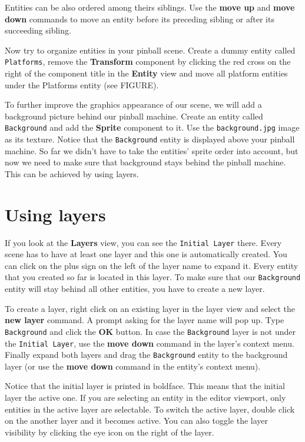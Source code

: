 \documentclass[a4paper,12pt]{article}
\begin{document}
Entities can be also ordered among theirs siblings. Use the \textbf{move up} and \textbf{move down} commands to move an entity before its preceding sibling or after its succeeding sibling.

Now try to organize entities in your pinball scene. Create a dummy entity called \texttt{Platforms}, remove the \textbf{Transform} component by clicking the red cross on the right of the component title in the \textbf{Entity} view and move all platform entities under the Platforms entity (see FIGURE).

To further improve the graphics appearance of our scene, we will add a background picture behind our pinball machine. Create an entity called \texttt{Background} and add the \textbf{Sprite} component to it. Use the \texttt{background.jpg} image as its texture. Notice that the \texttt{Background} entity is displayed above your pinball machine. So far we didn't have to take the entities' sprite order into account, but now we need to make sure that background stays behind the pinball machine. This can be achieved by using layers.  

\section{Using layers}

If you look at the \textbf{Layers} view, you can see the \texttt{Initial Layer} there. Every scene has to have at least one layer and this one is automatically created. You can click on the plus sign on the left of the layer name to expand it. Every entity that you created so far is located in this layer. To make sure that our \texttt{Background} entity will stay behind all other entities, you have to create a new layer.

To create a layer, right click on an existing layer in the layer view and select the \textbf{new layer} command. A prompt asking for the layer name will pop up. Type \texttt{Background} and click the \textbf{OK} button. In case the \texttt{Background} layer is not under the \texttt{Initial Layer}, use the \textbf{move down} command in the layer's context menu. Finally expand both layers and drag the \texttt{Background} entity to the background layer (or use the \textbf{move down} command in the entity's context menu).

Notice that the initial layer is printed in boldface. This means that the initial layer the active one. If you are selecting an entity in the editor viewport, only entities in the active layer are selectable. To switch the active layer, double click on the another layer and it becomes active. You can also toggle the layer visibility by clicking the eye icon on the right of the layer.
\end{document}
